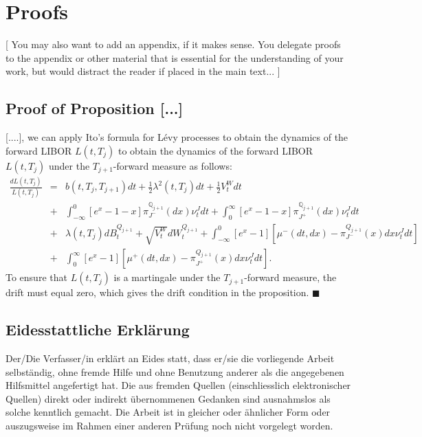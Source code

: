 \documentclass[11pt,a4paper,english,oneside]{book}
\numberwithin{equation}{chapter}
\begin{document}
\chapter{Proofs}

[ You may also want to add an appendix, if it makes sense. You delegate proofs to the appendix or other material that is essential for the understanding of your work, but would distract the reader if placed in the main text... ]

\section{Proof of Proposition [...] }
[....], we can apply Ito's formula for Lévy processes   to obtain the
dynamics of the forward LIBOR $L(t,T_j)$ to obtain the
dynamics of the forward LIBOR $L(t,T_j)$ under the $T_{j+1}$-forward measure
as follows:
\begin{eqnarray}
\frac{dL(t,T_j)}{L(t,T_j)} &=& b (t,T_{j},T_{j+1}) dt +
\frac{1}{2} \lambda ^2(t,T_j) dt +
\frac{1}{2} V _t^W dt\nonumber \\
&+& \int_{-\infty}^{0}  \left[ e^{x}-1-x \right]
\pi_{J^-}^{\mathbb Q_{j+1}}(dx)\nu _t^J dt + \int_{0}^{\infty} \left[
e^{x}-1-x \right] \pi_{J^+}^{\mathbb Q_{j+1}}(dx)\nu _t^Jdt \nonumber \\
&+& \lambda (t,T_j) dB_{t}^{Q_{j+1}}+ \sqrt{ V _t^W}
dW_{t}^{Q_{j+1}}+ \int_{-\infty}^{0} \left[ e^{ x}-1 \right]
\left[ \mu^- (dt,dx) -
\pi_{J^-}^{Q_{j+1}}(x) dx \nu _t^J dt \right]\nonumber \\
&+& \int_{0}^{\infty} \left[ e^{ x}-1 \right] \left[ \mu ^+ (dt,dx)
- \pi_{J^+}^{Q_{j+1}}(x) dx \nu _t^J dt \right].
\end{eqnarray}
To ensure that $L(t,T_j)$ is a martingale under the
$T_{j+1}$-forward measure, the drift must equal zero, which gives the
drift condition in the proposition. $\blacksquare$

\printglossary
\glsaddall

\printbibliography[heading=bibintoc]


\newpage
\thispagestyle{firststyle}
\section*{Eidesstattliche Erklärung}
Der/Die Verfasser/in erklärt an Eides statt, dass er/sie die vorliegende Arbeit selbständig, ohne fremde Hilfe und ohne Benutzung anderer als die angegebenen Hilfsmittel angefertigt hat. Die aus fremden Quellen (einschliesslich elektronischer Quellen) direkt oder indirekt übernommenen Gedanken sind ausnahmslos als solche kenntlich gemacht. Die Arbeit ist in gleicher oder ähnlicher Form oder auszugsweise im Rahmen einer anderen Prüfung noch nicht vorgelegt worden.\\[2cm]
 \hfill {}
\hfill \\[2cm]
 \hfill {}
\end{document}
